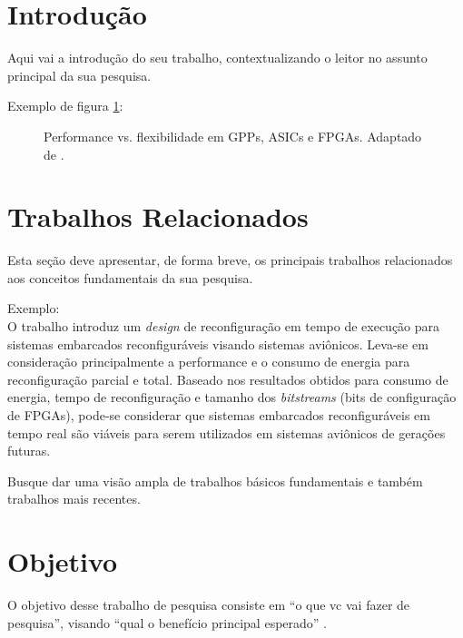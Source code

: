 \documentclass[12pt,a4paper]{article}
\begin{document}
\newpage
\section{Introdução}
\label{sec:introducao}
Aqui vai a introdução do seu trabalho, contextualizando o leitor no assunto principal da sua pesquisa.

Exemplo de figura \ref{fig:perf_flex}:

\begin{figure}[ht]
	\centering
	\caption{Performance vs. flexibilidade em GPPs, ASICs e FPGAs.
	  Adaptado de \cite{Bobda2007a}.}
	\label{fig:perf_flex}
\end{figure}


\section{Trabalhos Relacionados}
\label{sec:trabalhos-relacionados}
Esta seção deve apresentar, de forma breve, os principais trabalhos relacionados aos conceitos fundamentais da sua pesquisa.

Exemplo:\\%
O trabalho \cite{Loubach2016a} introduz um \textit{design} de reconfiguração em tempo de execução para sistemas embarcados reconfiguráveis visando sistemas aviônicos. Leva-se em consideração principalmente a performance e o consumo de energia para reconfiguração parcial e total. Baseado nos resultados obtidos para consumo de energia, tempo de reconfiguração e tamanho dos \textit{bitstreams} (bits de configuração de FPGAs), pode-se considerar que sistemas embarcados reconfiguráveis em tempo real são viáveis para serem utilizados em sistemas aviônicos de gerações futuras.

Busque dar uma visão ampla de trabalhos básicos fundamentais e também trabalhos mais recentes.


\section{Objetivo}
\label{sec:objetivo}
O objetivo desse trabalho de pesquisa consiste em ``o que vc vai fazer de pesquisa'', visando ``qual o benefício principal esperado'' .
\end{document}
